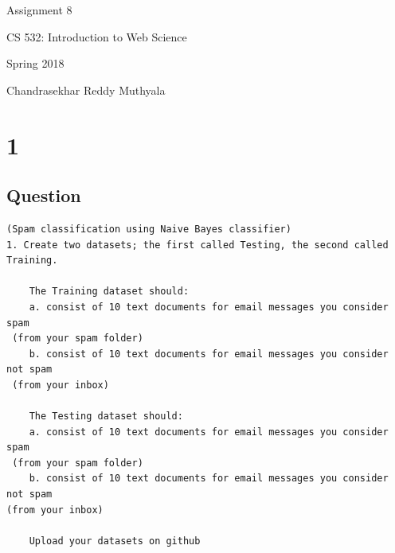 \documentclass[letterpaper,11pt]{article}
\begin{document}
\begin{titlepage}

\begin{center}

\Huge{Assignment 8}

\Large{CS 532:  Introduction to Web Science}

\Large{Spring 2018}

\Large{Chandrasekhar Reddy Muthyala}


\end{center}

\end{titlepage}

\newpage


\section*{1}

\subsection*{Question}

\begin{verbatim}
(Spam classification using Naive Bayes classifier)
1. Create two datasets; the first called Testing, the second called Training. 
	
	The Training dataset should:
	a. consist of 10 text documents for email messages you consider spam
 (from your spam folder)
	b. consist of 10 text documents for email messages you consider not spam
 (from your inbox)

	The Testing dataset should:
	a. consist of 10 text documents for email messages you consider spam
 (from your spam folder)
	b. consist of 10 text documents for email messages you consider not spam 
(from your inbox)

	Upload your datasets on github
\end{verbatim}

\clearpage
\end{document}
